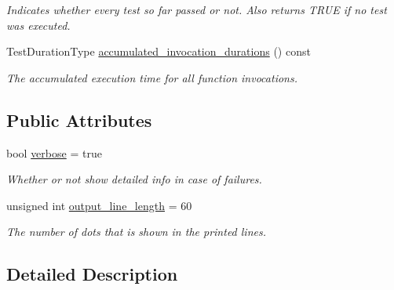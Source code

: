 \begin{DoxyCompactItemize}
\begin{DoxyCompactList}\small\item\em Indicates whether every test so far passed or not. Also returns T\+R\+UE if no test was executed. \end{DoxyCompactList}\item 
Test\+Duration\+Type \hyperlink{classunittest_1_1_function_test_a09ae97b06e34d144f243dcef00ead1a9}{accumulated\+\_\+invocation\+\_\+durations} () const \hypertarget{classunittest_1_1_function_test_a09ae97b06e34d144f243dcef00ead1a9}{}\label{classunittest_1_1_function_test_a09ae97b06e34d144f243dcef00ead1a9}

\begin{DoxyCompactList}\small\item\em The accumulated execution time for all function invocations. \end{DoxyCompactList}\end{DoxyCompactItemize}
\subsection*{Public Attributes}
\begin{DoxyCompactItemize}
\item 
bool \hyperlink{classunittest_1_1_function_test_a0eb2680ff0867ff55daffa2b09c90280}{verbose} = true\hypertarget{classunittest_1_1_function_test_a0eb2680ff0867ff55daffa2b09c90280}{}\label{classunittest_1_1_function_test_a0eb2680ff0867ff55daffa2b09c90280}

\begin{DoxyCompactList}\small\item\em Whether or not show detailed info in case of failures. \end{DoxyCompactList}\item 
unsigned int \hyperlink{classunittest_1_1_function_test_aa9959c19872e086b9401382cb381f552}{output\+\_\+line\+\_\+length} = 60\hypertarget{classunittest_1_1_function_test_aa9959c19872e086b9401382cb381f552}{}\label{classunittest_1_1_function_test_aa9959c19872e086b9401382cb381f552}

\begin{DoxyCompactList}\small\item\em The number of dots that is shown in the printed lines. \end{DoxyCompactList}\end{DoxyCompactItemize}


\subsection{Detailed Description}
